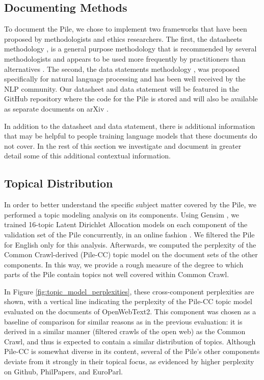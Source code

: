 \documentclass[11pt,a4paper]{article}
\begin{document}
\subsection{Documenting Methods}

To document the Pile, we chose to implement two frameworks that have been proposed by methodologists and ethics researchers. The first, the datasheets methodology \citep{datasheets}, is a general purpose methodology that is recommended by several methodologists \citep{best-practice1,best-practice2} and appears to be used more frequently by practitioners than alternatives \citep{datasheet1,datasheet2,datasheet3}. The second, the data statements methodology \citep{datastatement}, was proposed specifically for natural language processing and has been well received by the NLP community. Our datasheet and data statement will be featured in the GitHub repository where the code for the Pile is stored and will also be available as separate documents on arXiv \citep{pile-datasheet,pile-datastatement}.

In addition to the datasheet and data statement, there is additional information that may be helpful to people training language models that these documents do not cover. In the rest of this section we investigate and document in greater detail some of this additional contextual information.

\subsection{Topical Distribution}

In order to better understand the specific subject matter covered by the Pile, we performed a topic modeling analysis on its components. Using Gensim \citep{gensim}, we trained 16-topic Latent Dirichlet Allocation \citep{lda} models on each component of the validation set of the Pile concurrently, in an online fashion \citep{onlinelda}. We filtered the Pile for English only for this analysis. Afterwards, we computed the perplexity of the Common Crawl-derived (Pile-CC) topic model on the document sets of the other components. In this way, we provide a rough measure of the degree to which parts of the Pile contain topics not well covered within Common Crawl.

In Figure \ref{fig:topic_model_perplexities}, these cross-component perplexities are shown, with a vertical line indicating the perplexity of the Pile-CC topic model evaluated on the documents of OpenWebText2. This component was chosen as a baseline of comparison for similar reasons as in the previous evaluation: it is derived in a similar manner (filtered crawls of the open web) as the Common Crawl, and thus is expected to contain a similar distribution of topics. Although Pile-CC is somewhat diverse in its content, several of the Pile's other components deviate from it strongly in their topical focus, as evidenced by higher perplexity on Github, PhilPapers, and EuroParl.
\end{document}

